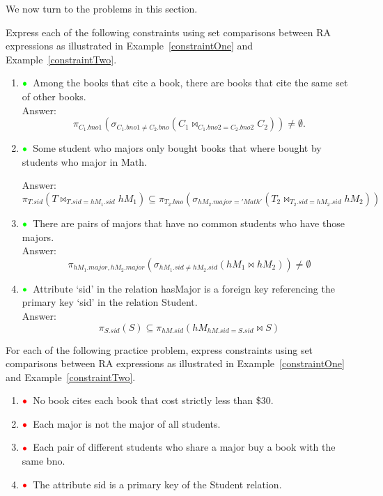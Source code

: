 \documentclass[11pt]{article}
\newcommand{\red}[1]{{\color{red}#1}}
\newcommand{\green}[1]{{\color{green}#1}}
\newcommand{\redbullet}{$\red{\bullet}$}
\newcommand{\greenbullet}{$\green{\bullet}$}
\begin{document}
\bigskip
We now turn to the problems in this section.

Express each of the following constraints using set comparisons between RA expressions as illustrated in Example~\ref{constraintOne} and
Example~\ref{constraintTwo}.

\begin{enumerate}[resume]
\item \greenbullet\  Among the books that cite a book, there are books that cite the same set of other books.\\

Answer:
\[\pi_{C_{1}.bno1}(\sigma_{C_{1}.bno1\neq C_{2}.bno}(C_{1}\bowtie_{C_{1}.bno2  = C_{2}.bno2} C_{2})) \neq \emptyset .
\]



\item \greenbullet\  Some student who majors only bought books that where bought by students who major in Math.

Answer:
\[\pi_{T.sid}(T\bowtie_{T.sid=hM_{1}.sid}hM_{1}) \subseteq\pi_{T_{2}.bno}(\sigma_{hM_{2}.major = 'Math'}(T_{2}\bowtie_{T_{2}.sid=hM_{2}.sid}hM_{2}))
\]



\item \greenbullet\  There are pairs of majors that have no common students who have those majors.
\\Answer:
\[\pi_{hM_{1}.major,hM_{2}.major}(\sigma_{hM_{1}.sid \neq hM_{2}.sid}(hM_{1}\bowtie hM_{2})) \neq \emptyset
\]



\item \greenbullet\  Attribute `sid' in the relation hasMajor is a foreign key referencing the primary key `sid' in the relation Student.\\
Answer:
\[\pi_{S.sid}(S) \subseteq \pi_{hM.sid}(hM_{hM.sid=S.sid}\bowtie S)
\]

\end{enumerate}

For each of the following practice problem, express constraints using set comparisons between RA expressions as illustrated in Example~\ref{constraintOne} and Example~\ref{constraintTwo}.



\begin{enumerate}[resume]
\item \redbullet\ No book cites each book that cost strictly 
less than \$30.

\item \redbullet\  Each major is not the major of all students.


\item \redbullet\  Each pair of different students who share a major buy a book with the same bno.

\item \redbullet\  The attribute sid is a primary key of the Student relation.


\end{enumerate}
\end{document}
